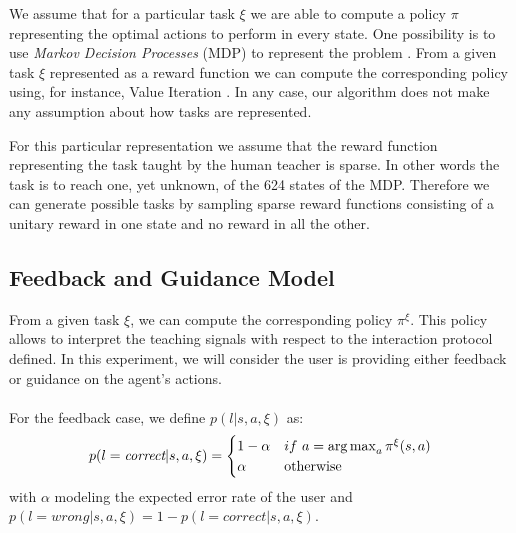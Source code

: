 We assume that for a particular task $\xi$ we are able to compute a policy $\pi$ representing the optimal actions to perform in every state. One possibility is to use \textit{Markov Decision Processes} (MDP) to represent the problem \cite{sutton1998reinforcement}. From a given task $\xi$ represented as a reward function we can compute the corresponding policy using, for instance, Value Iteration \cite{sutton1998reinforcement}. In any case, our algorithm does not make any assumption about how tasks are represented.

For this particular representation we assume that the reward function representing the task taught by the human teacher is sparse. In other words the task is to reach one, yet unknown, of the 624 states of the MDP. Therefore we can generate possible tasks by sampling sparse reward functions consisting of a unitary reward in one state and no reward in all the other. 

\subsection{Feedback and Guidance Model}
\label{chapter:lfui:framemodels}

From a given task $\xi$, we can compute the corresponding policy $\pi^{\xi}$. This policy allows to interpret the teaching signals with respect to the interaction protocol defined. In this experiment, we will consider the user is providing either feedback or guidance on the agent's actions. 

\paragraph{} For the feedback case, we define $p(l |s,a,\xi)$ as:
%
\begin{equation}
    p(l = \emph{correct} |s,a,\xi) = 
    \begin{cases}
    1-\alpha               & if~a = \argmax_a \pi^{\xi}(s,a)\\
        \alpha             & \text{otherwise}\\
   \end{cases}
\end{equation}
%
with $\alpha$ modeling the expected error rate of the user and $p(l = wrong |s,a,\xi) = 1 - p(l = correct |s,a,\xi)$.

